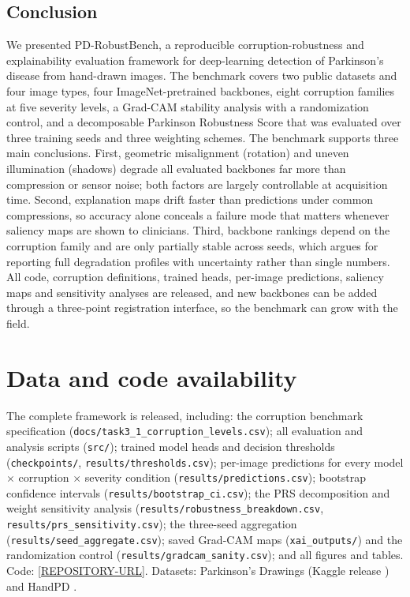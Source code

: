 \documentclass[11pt,a4paper]{article}
\begin{document}
\subsection{Conclusion}
\label{sec:conclusion}
We presented PD-RobustBench, a reproducible corruption-robustness and
explainability evaluation framework for deep-learning detection of
Parkinson's disease from hand-drawn images. The benchmark covers two public
datasets and four image types, four ImageNet-pretrained backbones, eight
corruption families at five severity levels, a Grad-CAM stability analysis
with a randomization control, and a decomposable Parkinson Robustness Score
that was evaluated over three training seeds and three weighting schemes.
The benchmark supports three main conclusions. First, geometric misalignment
(rotation) and uneven illumination (shadows) degrade all evaluated backbones
far more than compression or sensor noise; both factors are largely
controllable at acquisition time. Second, explanation maps drift faster than
predictions under common compressions, so accuracy alone conceals a failure
mode that matters whenever saliency maps are shown to clinicians. Third,
backbone rankings depend on the corruption family and are only partially
stable across seeds, which argues for reporting full degradation profiles
with uncertainty rather than single numbers. All code, corruption
definitions, trained heads, per-image predictions, saliency maps and
sensitivity analyses are released, and new backbones can be added through a
three-point registration interface, so the benchmark can grow with the
field.

\section*{Data and code availability}
The complete framework is released, including: the corruption benchmark
specification (\texttt{docs/task3\_1\_corruption\_levels.csv}); all
evaluation and analysis scripts (\texttt{src/}); trained model heads and
decision thresholds (\texttt{checkpoints/}, \texttt{results/thresholds.csv});
per-image predictions for every model $\times$ corruption $\times$ severity
condition (\texttt{results/predictions.csv}); bootstrap confidence intervals
(\texttt{results/bootstrap\_ci.csv}); the PRS decomposition and weight
sensitivity analysis (\texttt{results/robustness\_breakdown.csv},
\texttt{results/prs\_sensitivity.csv}); the three-seed aggregation
(\texttt{results/seed\_aggregate.csv}); saved Grad-CAM maps
(\texttt{xai\_outputs/}) and the randomization control
(\texttt{results/gradcam\_sanity.csv}); and all figures and tables. Code:
\url{[REPOSITORY-URL]}. Datasets: Parkinson's Drawings (Kaggle release
\cite{kagglepdrawings}) and HandPD \cite{handpddata,pereira2016}.
\end{document}
